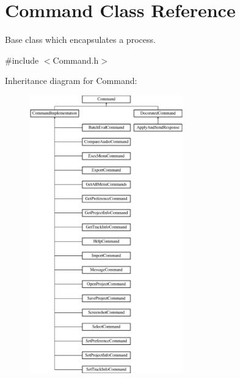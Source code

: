 \hypertarget{class_command}{}\section{Command Class Reference}
\label{class_command}


Base class which encapsulates a process.  




{\ttfamily \#include $<$Command.\+h$>$}

Inheritance diagram for Command\+:\begin{figure}[H]
\begin{center}
\leavevmode
\includegraphics[height=12.000000cm]{class_command}
\end{center}
\end{figure}
